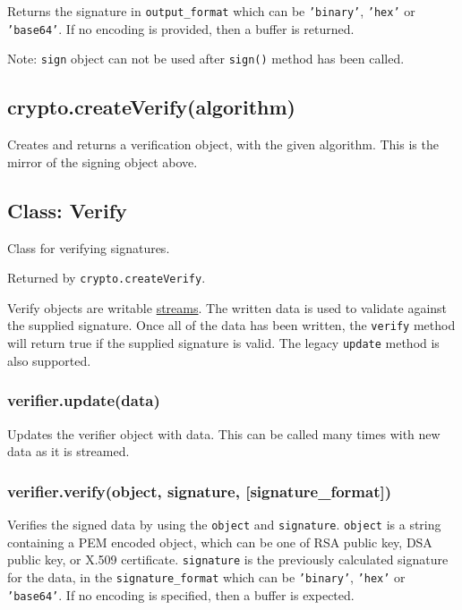 Returns the signature in \texttt{output\_format} which can be
\texttt{'binary'}, \texttt{'hex'} or \texttt{'base64'}. If no encoding
is provided, then a buffer is returned.

Note: \texttt{sign} object can not be used after \texttt{sign()} method
has been called.

\subsection{crypto.createVerify(algorithm)}

Creates and returns a verification object, with the given algorithm.
This is the mirror of the signing object above.

\subsection{Class: Verify}

Class for verifying signatures.

Returned by \texttt{crypto.createVerify}.

Verify objects are writable \href{stream.html}{streams}. The written
data is used to validate against the supplied signature. Once all of the
data has been written, the \texttt{verify} method will return true if
the supplied signature is valid. The legacy \texttt{update} method is
also supported.

\subsubsection{verifier.update(data)}

Updates the verifier object with data. This can be called many times
with new data as it is streamed.

\subsubsection{verifier.verify(object, signature,
{[}signature\_format{]})}

Verifies the signed data by using the \texttt{object} and
\texttt{signature}. \texttt{object} is a string containing a PEM encoded
object, which can be one of RSA public key, DSA public key, or X.509
certificate. \texttt{signature} is the previously calculated signature
for the data, in the \texttt{signature\_format} which can be
\texttt{'binary'}, \texttt{'hex'} or \texttt{'base64'}. If no encoding
is specified, then a buffer is expected.

